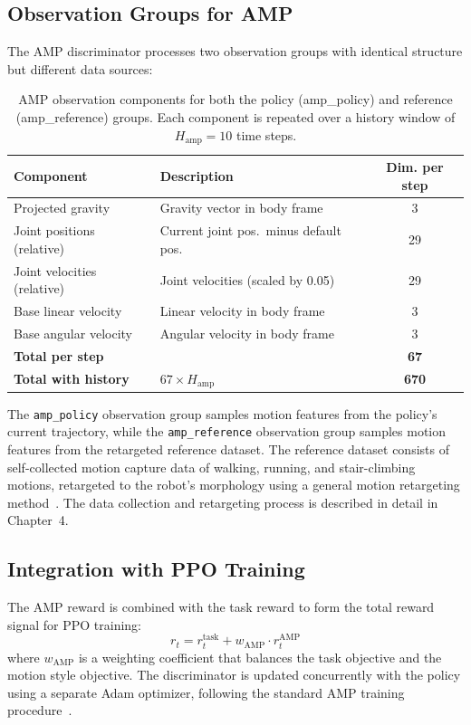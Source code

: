 \subsection{Observation Groups for AMP}

The AMP discriminator processes two observation groups with identical structure but different data sources:

\begin{table}[t]
\centering
\caption{AMP observation components for both the policy (amp\_policy) and reference (amp\_reference) groups. Each component is repeated over a history window of $H_{\text{amp}}=10$ time steps.}
\label{tab:amp_obs}
\begin{tabular}{llc}
\toprule
\textbf{Component} & \textbf{Description} & \textbf{Dim. per step} \\
\midrule
Projected gravity & Gravity vector in body frame & 3 \\
Joint positions (relative) & Current joint pos.\ minus default pos. & 29 \\
Joint velocities (relative) & Joint velocities (scaled by 0.05) & 29 \\
Base linear velocity & Linear velocity in body frame & 3 \\
Base angular velocity & Angular velocity in body frame & 3 \\
\midrule
\textbf{Total per step} & & \textbf{67} \\
\textbf{Total with history} & $67 \times H_{\text{amp}}$ & \textbf{670} \\
\bottomrule
\end{tabular}
\end{table}

The \texttt{amp\_policy} observation group samples motion features from the policy's current trajectory, while the \texttt{amp\_reference} observation group samples motion features from the retargeted reference dataset. The reference dataset consists of self-collected motion capture data of walking, running, and stair-climbing motions, retargeted to the robot's morphology using a general motion retargeting method~\cite{araujo2024retargeting}. The data collection and retargeting process is described in detail in Chapter~4.

\subsection{Integration with PPO Training}

The AMP reward is combined with the task reward to form the total reward signal for PPO training:
\begin{equation}
    r_t = r_t^{\text{task}} + w_{\text{AMP}} \cdot r_t^{\text{AMP}}
\end{equation}
where $w_{\text{AMP}}$ is a weighting coefficient that balances the task objective and the motion style objective. The discriminator is updated concurrently with the policy using a separate Adam optimizer, following the standard AMP training procedure~\cite{peng2021amp}.

